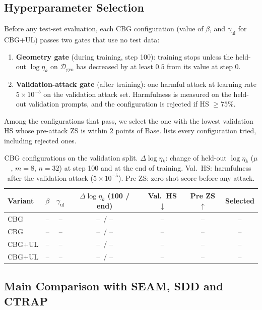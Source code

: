 \documentclass[11pt]{article}
\newcommand{\etak}{\eta_{k}}
\newcommand{\tbd}{\textcolor{gray}{--}}
\begin{document}
\subsection{Hyperparameter Selection}
\label{sec:exp_selection}

Before any test-set evaluation, each CBG configuration (value of $\beta$, and $\gamma_{\mathrm{ul}}$ for CBG+UL) passes two gates that use no test data:
\begin{enumerate}
  \item \textbf{Geometry gate} (during training, step 100): training stops unless the held-out $\log\etak$ on $\mathcal D_{\mathrm{geo}}$ has decreased by at least $0.5$ from its value at step 0.
  \item \textbf{Validation-attack gate} (after training): one harmful attack at learning rate $5\times10^{-5}$ on the validation attack set. Harmfulness is measured on the held-out validation prompts, and the configuration is rejected if HS $\geq 75\%$.
\end{enumerate}
Among the configurations that pass, we select the one with the lowest validation HS whose pre-attack ZS is within $2$ points of Base.  lists every configuration tried, including rejected ones.

\begin{table}[t]
\centering
\small
\caption{CBG configurations on the validation split. $\Delta\log\etak$: change of held-out $\log\etak$ ($\mu$, $m=8$, $n=32$) at step 100 and at the end of training. Val.\ HS: harmfulness after the validation attack ($5\times10^{-5}$). Pre ZS: zero-shot score before any attack.}
\label{tab:selection}
\begin{tabular}{lcccccc}
\toprule
Variant & $\beta$ & $\gamma_{\mathrm{ul}}$ & $\Delta\log\etak$ (100 / end) & Val.\ HS$\downarrow$ & Pre ZS$\uparrow$ & Selected\\
\midrule
CBG    & \tbd & -- & \tbd\ / \tbd & \tbd & \tbd & \tbd\\
CBG    & \tbd & -- & \tbd\ / \tbd & \tbd & \tbd & \tbd\\
CBG+UL & \tbd & \tbd & \tbd\ / \tbd & \tbd & \tbd & \tbd\\
CBG+UL & \tbd & \tbd & \tbd\ / \tbd & \tbd & \tbd & \tbd\\
\bottomrule
\end{tabular}
\end{table}



\subsection{Main Comparison with SEAM, SDD and CTRAP}
\label{sec:exp_main}
\end{document}
